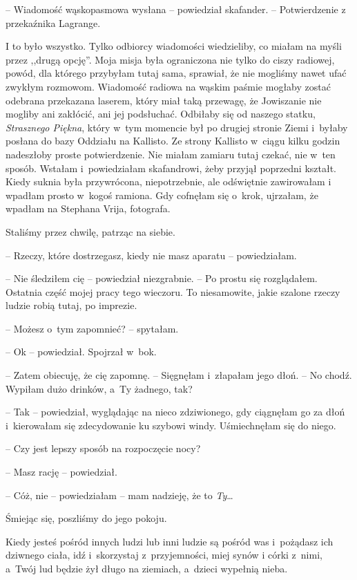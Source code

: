 \documentclass[oneside,polish,11pt,sfheadings]{mwbk}
\begin{document}
-- Wiadomość wąskopasmowa wysłana -- powiedział skafander. -- Potwierdzenie
z przekaźnika Lagrange.

I to było wszystko. Tylko odbiorcy wiadomości wiedzieliby, co miałam na
myśli przez ,,drugą opcję''. Moja misja była ograniczona nie tylko do
ciszy radiowej, powód, dla którego przybyłam tutaj sama, sprawiał, że
nie mogliśmy nawet ufać zwykłym rozmowom. Wiadomość radiowa na wąskim
paśmie mogłaby zostać odebrana przekazana laserem, który miał taką
przewagę, że Jowiszanie nie mogliby ani zakłócić, ani jej podsłuchać.
Odbiłaby się od naszego statku, \textit{Strasznego Piękna}, który w~tym
momencie był po drugiej stronie Ziemi i~byłaby posłana do bazy Oddziału
na Kallisto. Ze strony Kallisto w~ciągu kilku godzin nadeszłoby proste
potwierdzenie. Nie miałam zamiaru tutaj czekać, nie w~ten sposób.
Wstałam i~powiedziałam skafandrowi, żeby przyjął poprzedni kształt.
Kiedy suknia była przywrócona, niepotrzebnie, ale odświętnie zawirowałam
i wpadłam prosto w~kogoś ramiona. Gdy cofnęłam się o~krok, ujrzałam, że
wpadłam na Stephana Vrija, fotografa.

Staliśmy przez chwilę, patrząc na siebie.

-- Rzeczy, które dostrzegasz, kiedy nie masz aparatu -- powiedziałam.

-- Nie śledziłem cię -- powiedział niezgrabnie. -- Po prostu się
rozglądałem. Ostatnia część mojej pracy tego wieczoru. To niesamowite,
jakie szalone rzeczy ludzie robią tutaj, po imprezie.

-- Możesz o~tym zapomnieć? -- spytałam.

-- Ok -- powiedział. Spojrzał w~bok.

-- Zatem obiecuję, że cię zapomnę. -- Sięgnęłam i~złapałam jego dłoń. -- No
chodź. Wypiłam dużo drinków, a~Ty żadnego, tak?

-- Tak -- powiedział, wyglądając na nieco zdziwionego, gdy ciągnęłam go za
dłoń i~kierowałam się zdecydowanie ku szybowi windy. Uśmiechnęłam się do
niego.

-- Czy jest lepszy sposób na rozpoczęcie nocy?

-- Masz rację -- powiedział.

-- Cóż, nie -- powiedziałam -- mam nadzieję, że to \textit{Ty}\ldots 

Śmiejąc się, poszliśmy do jego pokoju.

Kiedy jesteś pośród innych ludzi lub inni ludzie są pośród was i~pożądasz ich dziwnego ciała, idź i~skorzystaj z~przyjemności, miej synów
i córki z~nimi, a~Twój lud będzie żył długo na ziemiach, a~dzieci
wypełnią nieba.
\end{document}
